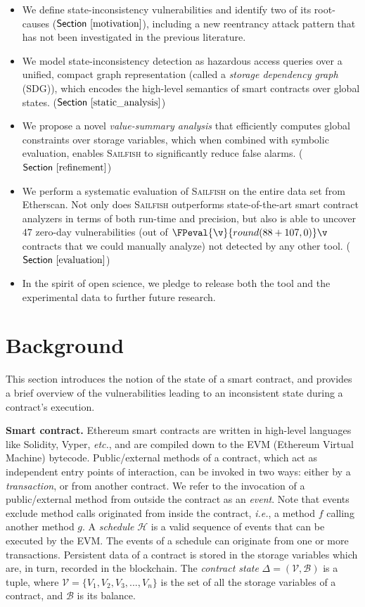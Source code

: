 \documentclass[conference, romanappendices]{tex/IEEEtran}
\theoremstyle{bfnote}
\newcommand{\toolname}{\textsc{Sailfish}\xspace}
\newcommand{\solidity}{{\sc Solidity}\xspace}
\newcommand{\vyper}{{\sc Vyper}\xspace}
\newcommand{\smart}{smart contract}
\newcommand{\ethereum}{Ethereum}
\newcommand{\etherscan}{{\sc Etherscan}\xspace}
\newcommand{\reentrancy}{{reentrancy}\xspace}
\newcommand{\haz}{{hazardous access}\xspace}
\newcommand{\si}{{state-inconsistency}\xspace}
\newcommand{\vsa}{{value-summary analysis}\xspace}
\newcommand{\sdg}{storage dependency graph\xspace}
\newcommand{\etc}{\textit{etc.}}
\newcommand{\ie}{\textit{i.e.}}
\newcommand{\Sect}[1]{\ensuremath{\sf Section~\ref{#1}}}
\newcommand{\clintOnlyDAOTriage}{88}
\newcommand{\clintOnlyTODTriage}{107}
\newcommand{\zeroDays}{47}
\begin{document}
\begin{itemize}
\item We define \si{} vulnerabilities and identify two of its root-causes (\Sect{motivation}),
including a new \reentrancy attack pattern that has not been investigated in the previous literature.

\item We model \si{} detection as \haz queries over a unified, compact graph representation (called a \emph{\sdg} (SDG)), which encodes the high-level semantics of smart contracts over global states. (\Sect{static_analysis})

\item We propose a novel \emph{\vsa} that efficiently computes global constraints over storage variables, which 
when combined with symbolic evaluation, enables \toolname to significantly reduce false alarms. (\Sect{refinement})

\item We perform a systematic evaluation of \toolname on the entire data set
from \etherscan.
Not only does \toolname outperforms state-of-the-art \smart{} analyzers in terms of both run-time and precision, but also is able to uncover $\zeroDays$ zero-day vulnerabilities (out of $\FPeval{\v}{round(\clintOnlyDAOTriage+\clintOnlyTODTriage,0)}\v$ contracts that we could manually analyze) not detected by any other tool. (\Sect{evaluation})

\item In the spirit of open science, we pledge to release both the tool and the experimental data to further future research.
\end{itemize}
 	\section{Background} 
\label{background}

This section introduces the notion of the state of a \smart, and provides a brief overview of the vulnerabilities leading to an inconsistent state during a contract's execution.

\noindent
\textbf{Smart contract.}
\ethereum{} \smart s are written in high-level languages like \solidity, \vyper, \etc, and are compiled down to the EVM (\ethereum{} Virtual Machine) bytecode.
Public/external methods of a contract, which act as independent entry points of interaction, can be invoked in two ways: either by a \textit{transaction}, or from another contract.
We refer to the invocation of a public/external method from outside the contract as an \textit{event}.
Note that events exclude method calls originated from inside the contract, \ie, a method $f$ calling another method $g$.
A \textit{schedule} $\mathcal{H}$ is a valid sequence of events that can be executed by the EVM.
The events of a schedule can originate from one or more transactions.
Persistent data of a contract is stored in the storage variables which are, in turn, recorded in the blockchain.
The \textit{contract state} $\Delta = (\mathcal{V}, \mathcal{B})$ is a tuple, where $\mathcal{V} = \{V_1, V_2, V_3,..., V_n\}$ is the set of all the storage variables of a contract, and $\mathcal{B}$ is its balance.
\end{document}
